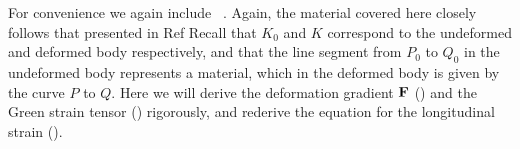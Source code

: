 % 
For convenience we again include ~. 
Again, the material covered here closely follows that presented in Ref \cite{contMech}
Recall that $K_0$ and $K$ correspond to the undeformed and deformed body respectively, and that the line segment from 
$P_0$ to $Q_0$ in the undeformed body represents a material, which in the deformed body is given by the curve $P$ to $Q$.
Here we will derive the deformation gradient ${\bf{F}}$ () and the Green strain tensor () rigorously,
and rederive the equation for the longitudinal strain ().

